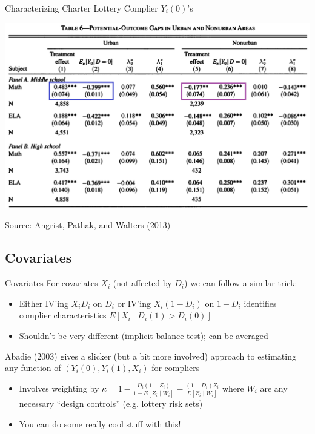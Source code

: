 \documentclass{beamer}
\begin{document}
\begin{frame}{Characterizing Charter Lottery Complier $Y_i(0)$'s}
\begin{center}
\includegraphics[scale=0.32]{./lecture_includes/cfx.png}
\end{center}
Source: Angrist, Pathak, and Walters (2013)
\end{frame}

\subsection{Covariates}
\vspace{-0.5cm}
\begin{frame}{Covariates}
For covariates $X_i$ (not affected by $D_i$) we can follow a similar trick:\smallskip
\begin{itemize}
\item Either IV'ing $X_iD_i$ on $D_i$ or IV'ing $X_i(1-D_i)$ on $1-D_i$ identifies complier characteristics $E[X_i\mid D_i(1)>D_i(0)]$\smallskip
\item Shouldn't be very different (implicit balance test); can be averaged
\end{itemize}\bigskip\pause{}
Abadie (2003) gives a slicker (but a bit more involved) approach to estimating any function of $(Y_i(0),Y_i(1),X_i)$ for compliers\smallskip
\begin{itemize}
\item Involves weighting by $\kappa=1-\frac{D_i(1-Z_i)}{1-E[Z_i\mid W_i]}-\frac{(1-D_i)Z_i}{E[Z_i\mid W_i]}$ where $W_i$ are any necessary ``design controls'' (e.g. lottery risk sets)\smallskip
\item You can do some really cool stuff with this!
\end{itemize}
\end{frame}
\end{document}
